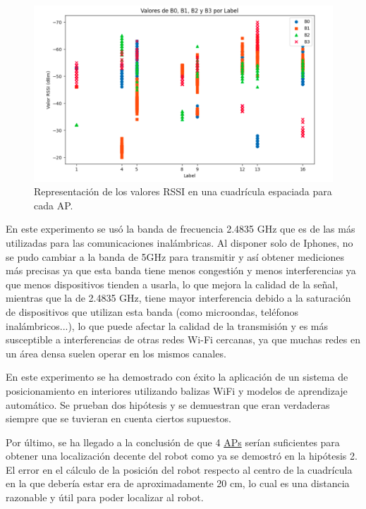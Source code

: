 \begin{figure}[H]
  \centering
  \includegraphics[scale=0.4]{figs/vals2} %
  \caption{ Representación de los valores RSSI en una cuadrícula espaciada para cada AP.}
  \label{fig:vals2}
\end{figure} 

En este experimento se usó la banda de frecuencia 2.4835 GHz que es de las más utilizadas para las comunicaciones inalámbricas. Al disponer solo de Iphones, no se pudo cambiar a la banda de 5GHz para transmitir y así obtener mediciones más precisas ya que esta banda tiene menos congestión y menos interferencias ya que menos dispositivos tienden a usarla, lo que mejora la calidad de la señal, mientras que la de 2.4835 GHz, tiene mayor interferencia debido a la saturación de dispositivos que utilizan esta banda (como microondas, teléfonos inalámbricos...), lo que puede afectar la calidad de la transmisión y es más susceptible a interferencias de otras redes Wi-Fi cercanas, ya que muchas redes en un área densa suelen operar en los mismos canales.

En este experimento se ha demostrado con éxito la aplicación de un sistema de posicionamiento en interiores utilizando balizas WiFi y modelos de aprendizaje automático. Se prueban dos hipótesis y se demuestran que eran verdaderas siempre que se tuvieran en cuenta ciertos supuestos.

Por último, se ha llegado a la conclusión de que 4 \hyperlink{APs}{APs} serían suficientes para obtener una localización decente del robot como ya se demostró en la hipótesis 2. El error en el cálculo de la posición del robot respecto al centro de la cuadrícula en la que debería estar era de aproximadamente 20 cm, lo cual es una distancia razonable y útil para poder localizar al robot.


